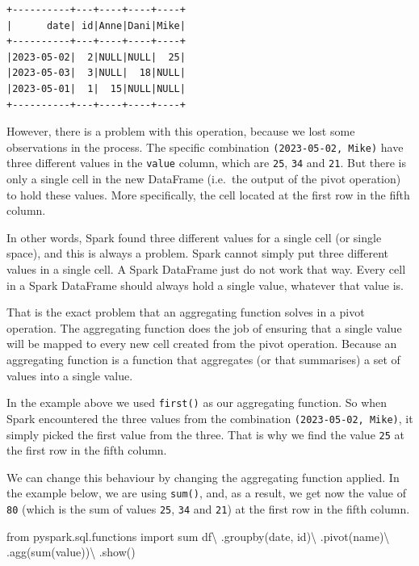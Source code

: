 \documentclass[
  11pt,
  letterpaper,
  DIV=11,
  numbers=noendperiod]{scrreprt}
\newenvironment{Shaded}{\begin{snugshade}}{\end{snugshade}}
\newcommand{\BuiltInTok}[1]{\textcolor[rgb]{0.00,0.23,0.31}{#1}}
\newcommand{\ImportTok}[1]{\textcolor[rgb]{0.00,0.46,0.62}{#1}}
\newcommand{\NormalTok}[1]{\textcolor[rgb]{0.00,0.23,0.31}{#1}}
\newcommand{\OperatorTok}[1]{\textcolor[rgb]{0.37,0.37,0.37}{#1}}
\newcommand{\StringTok}[1]{\textcolor[rgb]{0.13,0.47,0.30}{#1}}
\begin{document}
\begin{verbatim}
+----------+---+----+----+----+
|      date| id|Anne|Dani|Mike|
+----------+---+----+----+----+
|2023-05-02|  2|NULL|NULL|  25|
|2023-05-03|  3|NULL|  18|NULL|
|2023-05-01|  1|  15|NULL|NULL|
+----------+---+----+----+----+
\end{verbatim}

However, there is a problem with this operation, because we lost some
observations in the process. The specific combination
\texttt{(\textquotesingle{}2023-05-02\textquotesingle{},\ \textquotesingle{}Mike\textquotesingle{})}
have three different values in the \texttt{value} column, which are
\texttt{25}, \texttt{34} and \texttt{21}. But there is only a single
cell in the new DataFrame (i.e.~the output of the pivot operation) to
hold these values. More specifically, the cell located at the first row
in the fifth column.

In other words, Spark found three different values for a single cell (or
single space), and this is always a problem. Spark cannot simply put
three different values in a single cell. A Spark DataFrame just do not
work that way. Every cell in a Spark DataFrame should always hold a
single value, whatever that value is.

That is the exact problem that an aggregating function solves in a pivot
operation. The aggregating function does the job of ensuring that a
single value will be mapped to every new cell created from the pivot
operation. Because an aggregating function is a function that aggregates
(or that summarises) a set of values into a single value.

In the example above we used \texttt{first()} as our aggregating
function. So when Spark encountered the three values from the
combination
\texttt{(\textquotesingle{}2023-05-02\textquotesingle{},\ \textquotesingle{}Mike\textquotesingle{})},
it simply picked the first value from the three. That is why we find the
value \texttt{25} at the first row in the fifth column.

We can change this behaviour by changing the aggregating function
applied. In the example below, we are using \texttt{sum()}, and, as a
result, we get now the value of \texttt{80} (which is the sum of values
\texttt{25}, \texttt{34} and \texttt{21}) at the first row in the fifth
column.

\begin{Shaded}
\begin{Highlighting}[]
\ImportTok{from}\NormalTok{ pyspark.sql.functions }\ImportTok{import} \BuiltInTok{sum}
\NormalTok{df}\OperatorTok{\textbackslash{}}
\NormalTok{    .groupby(}\StringTok{\textquotesingle{}date\textquotesingle{}}\NormalTok{, }\StringTok{\textquotesingle{}id\textquotesingle{}}\NormalTok{)}\OperatorTok{\textbackslash{}}
\NormalTok{    .pivot(}\StringTok{\textquotesingle{}name\textquotesingle{}}\NormalTok{)}\OperatorTok{\textbackslash{}}
\NormalTok{    .agg(}\BuiltInTok{sum}\NormalTok{(}\StringTok{\textquotesingle{}value\textquotesingle{}}\NormalTok{))}\OperatorTok{\textbackslash{}}
\NormalTok{    .show()}
\end{Highlighting}
\end{Shaded}
\end{document}
